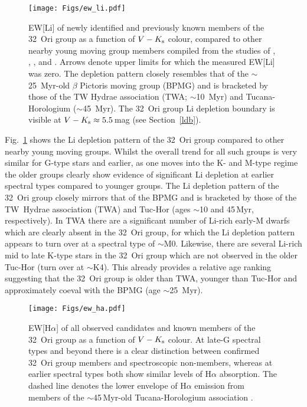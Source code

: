 \documentclass[usenatbib]{mnras}
\begin{document}
\begin{figure}
\centering
\texttt{[image: Figs/ew\_li.pdf]}
\caption[]{EW[Li] of newly identified and previously known members
  of the 32~Ori group as
  a function of $V-K_{\rm{s}}$ colour, compared to other nearby young
  moving group members compiled from the studies of \cite{daSilva09},
  \cite{Kraus14}, \cite{Malo14b}, and \cite{Binks16}. Arrows denote
  upper limits for which the measured EW[Li] was zero. The depletion
  pattern closely resembles that of the $\sim$25~Myr-old $\beta$ Pictoris
  moving group (BPMG) and is bracketed by those of the TW Hydrae
  association (TWA; $\sim$10~Myr) and Tucana-Horologium
  ($\sim$45~Myr). The 32~Ori group Li depletion boundary is visible at
  $V-K_{\rm{s}}\approx5.5$\,mag (see Section~\ref{ldb}).}
\label{fig:ew_li}
\end{figure}

Fig.~\ref{fig:ew_li} shows the Li depletion pattern of the 32~Ori
group compared to other nearby young moving groups. Whilst the overall
trend for all such groups is very similar for G-type stars and
earlier, as one moves into the K- and M-type regime the older
groups clearly show evidence of significant Li depletion at earlier
spectral types compared to younger groups. The Li depletion pattern of
the 32~Ori group closely mirrors that of the BPMG and is bracketed by
those of the TW~Hydrae association (TWA) and Tuc-Hor (ages $\sim$10
and 45\,Myr, respectively). In TWA there are a significant number of
Li-rich early-M dwarfs which are clearly absent in the 32~Ori
group, for which the Li depletion pattern appears to turn over at a
spectral type of $\sim$M0. Likewise, there are several Li-rich mid to
late K-type stars in the 32~Ori group which are not observed in the older
Tuc-Hor (turn over at $\sim$K4). This already provides a relative age
ranking suggesting that the 32~Ori group is older than TWA, younger
than Tuc-Hor and approximately coeval with the BPMG (age
$\sim$25~Myr).

\begin{figure}
\centering
\texttt{[image: Figs/ew\_ha.pdf]}
\caption[]{EW[H$\alpha$] of all observed candidates and known members
  of the 32~Ori group as a function of $V-K_{\rm{s}}$ colour.  At
  late-G spectral types and beyond there is a clear distinction
  between confirmed 32~Ori group members and spectroscopic
  non-members, whereas at earlier spectral types both show similar
  levels of H$\alpha$ absorption. The dashed line denotes the lower
  envelope of H$\alpha$ emission from members of the $\sim$45\,Myr-old
  Tucana-Horologium association \citep{Kraus14}.}
\label{fig:ew_ha}
\end{figure}
\end{document}

